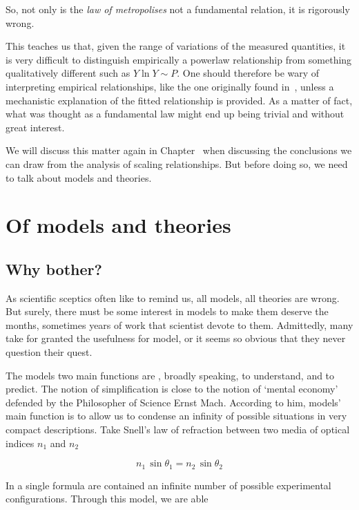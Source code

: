 So, not only is the \emph{law of metropolises} not a fundamental relation, it is
rigorously wrong. 

This teaches us that, given the range of variations of the measured
quantities, it is very difficult to distinguish empirically a powerlaw
relationship from something qualitatively different such as $Y \ln Y \sim P$.
One should therefore be wary of interpreting empirical relationships,
like the one originally found in~\cite{Pumain:1987}, unless a mechanistic
explanation of the fitted relationship is provided. As a matter of fact, what
was thought as a fundamental law might end up being trivial and without great
interest.

We will discuss this matter again in Chapter~\cite{chap:scaling-implications} when
discussing the conclusions we can draw from the analysis of scaling
relationships. But before doing so, we need to talk about models and theories.


\section{Of models and theories}

\subsection{Why bother?}
\label{sub:why_bother_}

As scientific sceptics often like to remind us, all models, all theories are
wrong. But surely, there must be some interest in models to make them deserve
the months, sometimes years of work that scientist devote to them. Admittedly,
many take for granted the usefulness for model, or it seems so obvious that they
never question their quest.

The models two main functions are , broadly speaking, to understand, and to
predict.  The notion of simplification is close to the notion of `mental
economy' defended by the Philosopher of Science Ernst Mach.  According to him,
models' main function is to allow us to condense an infinity of possible
situations in very compact descriptions. Take Snell's law of refraction between
two media of optical indices $n_1$ and $n_2$

\begin{equation}
    n_1\,\sin \theta_1 = n_2\,\sin \theta_2
\end{equation}

In a single formula are contained an infinite number of possible experimental
configurations. Through this model, we are able

